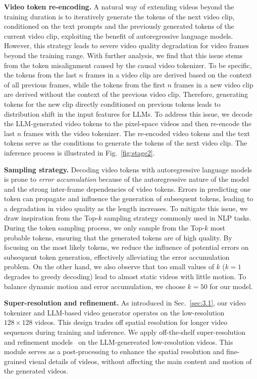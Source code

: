 \textbf{Video token re-encoding.}
A natural way of extending videos beyond the training duration is to iteratively generate the tokens of the next video clip, conditioned on the text prompts and the previously generated tokens of the current video clip, exploiting the benefit of autoregressive language models.
However, this strategy leads to severe video quality degradation for video frames beyond the training range.
With further analysis, we find that this issue stems from the token misalignment caused by the causal video tokenizer. To be specific, the tokens from the last $n$ frames in a video clip are derived based on the context of all previous frames, while the tokens from the first $n$ frames in a new video clip are derived without the context of the previous video clip. Therefore, generating tokens for the new clip directly conditioned on previous tokens leads to distribution shift in the input features for LLMs. To address this issue, we decode the LLM-generated video tokens to the pixel-space videos and then re-encode the last $n$ frames with the video tokenizer. The re-encoded video tokens and the text tokens serve as the conditions to generate the tokens of the next video clip. The inference process is illustrated in Fig.~\ref{fig:stage2}.

\textbf{Sampling strategy.}
Decoding video tokens with autoregressive language models is prone to \textit{error accumulation} because of the autoregressive nature of the model and the strong inter-frame dependencies of video tokens.
Errors in predicting one token can propagate and influence the generation of subsequent tokens, leading to a degradation in video quality as the length increases.
To mitigate this issue, we draw inspiration from the Top-$k$ sampling strategy commonly used in NLP tasks. During the token sampling process, we only sample from the Top-$k$ most probable tokens, ensuring that the generated tokens are of high quality. %
By focusing on the most likely tokens, we reduce the influence of potential errors on subsequent token generation, effectively alleviating the error accumulation problem. On the other hand, we also observe that too small values of $k$ ($k=1$ degrades to greedy decoding) lead to almost static videos with little motion. To balance dynamic motion and error accumulation, we choose $k=50$ for our model.

\textbf{Super-resolution and refinement.}
As introduced in Sec.~\ref{sec:3.1}, our video tokenizer and LLM-based video generator operates on the low-resolution $128\times 128$ videos. This design trades off spatial resolution for longer video sequences during training and inference. We apply off-the-shelf super-resolution and refinement models~\cite{stable_diff,guo2023animatediff,controlnet,mokady2023null} on the LLM-genereated low-resolution videos. This module serves as a post-processing to enhance the spatial resolution and fine-grained visual details of videos, without affecting the main content and motion of the generated videos. 
